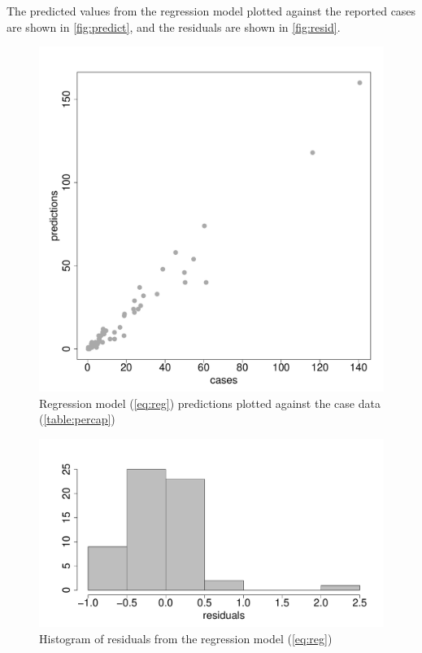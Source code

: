 \documentclass{article}
\begin{document}
The predicted values from the regression model plotted against the reported cases are shown in \autoref{fig:predict}, and the residuals are shown in \autoref{fig:resid}.
\begin{figure}
\begin{center}
\includegraphics{draftfinalreport_v2-024}
\end{center}
\caption{Regression model (\autoref{eq:reg}) predictions plotted against the case data (\autoref{table:percap})}
\label{fig:predict}
\end{figure}


\begin{figure}
\begin{center}
\includegraphics{draftfinalreport_v2-026}
\end{center}
\caption{Histogram of residuals from the regression model (\autoref{eq:reg})}
\label{fig:resid}
\end{figure}
\end{document}
